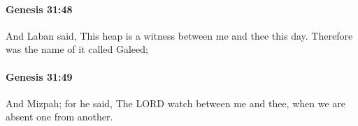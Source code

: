		\paragraph{Genesis 31:48} %
			\label{GENESIS-31-48}

			And Laban said, This heap is a witness between me and thee this day. Therefore was the name of it called Galeed;


		\paragraph{Genesis 31:49} %
			\label{GENESIS-31-49}

			And Mizpah; for he said, The LORD watch between me and thee, when we are absent one from another.


